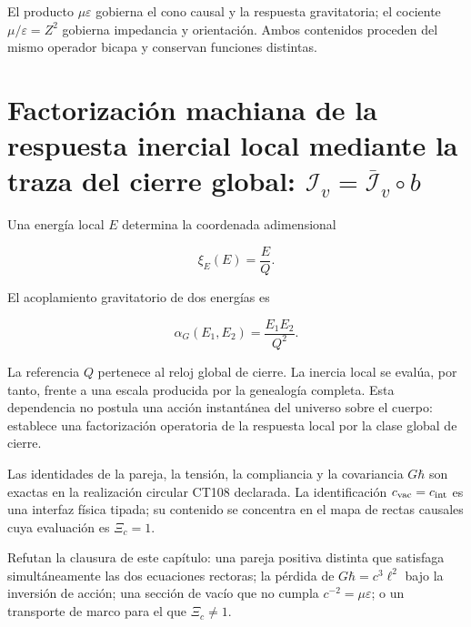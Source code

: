 El producto \(\mu\varepsilon\) gobierna el cono causal y la respuesta
gravitatoria; el cociente \(\mu/\varepsilon=Z^2\) gobierna impedancia y
orientaci\'on. Ambos contenidos proceden del mismo operador bicapa y conservan
funciones distintas.

\section{Factorización machiana de la respuesta inercial local mediante la traza del cierre global: \(\mathcal I_v=\overline{\mathcal I}_v\circ b\)}

Una energ\'ia local \(E\) determina la coordenada adimensional

\[
\xi_E(E)=\frac{E}{Q}.
\]

El acoplamiento gravitatorio de dos energ\'ias es

\begin{equation}
\alpha_G(E_1,E_2)=\frac{E_1E_2}{Q^2}.
\label{eq:rm-mach-coupling}
\end{equation}

La referencia \(Q\) pertenece al reloj global de cierre. La inercia local se
eval\'ua, por tanto, frente a una escala producida por la genealog\'ia completa.
Esta dependencia no postula una acci\'on instant\'anea del universo sobre el
cuerpo: establece una factorizaci\'on operatoria de la respuesta local por la
clase global de cierre.

\begin{proofstatusbox}
Las identidades de la pareja, la tensi\'on, la compliancia y la covariancia
\(G\hbar\) son exactas en la realizaci\'on circular CT108 declarada. La
identificaci\'on \(c_{\rm vac}=c_{\rm int}\) es una interfaz f\'isica tipada;
su contenido se concentra en el mapa de rectas causales cuya evaluaci\'on es
\(\Xi_c=1\).
\end{proofstatusbox}

\begin{falsifierbox}
Refutan la clausura de este cap\'itulo: una pareja positiva distinta que
satisfaga simult\'aneamente las dos ecuaciones rectoras; la p\'erdida de
\(G\hbar=c^3\ell^2\) bajo la inversi\'on de acci\'on; una secci\'on de vac\'io
que no cumpla \(c^{-2}=\mu\varepsilon\); o un transporte de marco para el que
\(\Xi_c\ne1\).
\end{falsifierbox}
